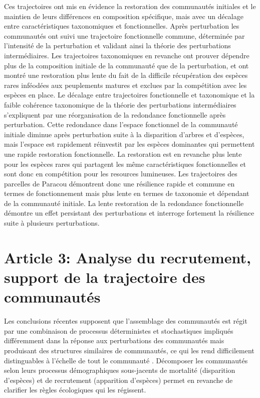 \documentclass[
  11pt,
  french,
  A4paper,
  extrafontsizes,onecolumn,openright
  ]{memoir}
\begin{document}
Ces trajectoires ont mis en évidence la restoration des communautés
initiales et le maintien de leurs différences en composition spécifique,
mais avec un décalage entre caractéristiques taxonomiques et
fonctionnelles. Après perturbation les communautés ont suivi une
trajectoire fonctionnelle commune, déterminée par l'intensité de la
perturbation et validant ainsi la théorie des perturbations
intermédiaires. Les trajectoires taxonomiques en revanche ont prouver
dépendre plus de la composition initiale de la communauté que de la
perturbation, et ont montré une restoration plus lente du fait de la
difficile récupération des espèces rares inféodées aux peuplements
matures et exclues par la compétition avec les espèces en place. Le
décalage entre trajectoires fonctionnelle et taxonomique et la faible
cohérence taxonomique de la théorie des perturbations intermédiaires
s'expliquent par une réorganisation de la redondance fonctionnelle après
perturbation. Cette redondance dans l'espace fonctionnel de la
communauté initiale diminue après perturbation suite à la disparition
d'arbres et d'espèces, mais l'espace est rapidement réinvestit par les
espèces dominantes qui permettent une rapide restoration fonctionnelle.
La restoration est en revanche plus lente pour les espèces rares qui
partagent les même caractéristiques fonctionnelles et sont donc en
compétition pour les resources lumineuses. Les trajectoires des
parcelles de Paracou démontrent donc une résilience rapide et commune en
termes de fonctionnement mais plus lente en termes de taxonomie et
dépendant de la communauté initiale. La lente restoration de la
redondance fonctionnelle démontre un effet persistant des perturbations
et interroge fortement la résilience suite à plusieurs perturbations.

\chapter{Article 3: Analyse du recrutement, support de la trajectoire
des
communautés}\label{article-3-analyse-du-recrutement-support-de-la-trajectoire-des-communautes}

Les conclusions récentes supposent que l'assemblage des communautés est
régit par une combinaison de processus déterministes et stochastiques
impliqués différemment dans la réponse aux perturbations des communautés
mais produisant des structures similaires de communautés, ce qui les
rend difficilement distinguables à l'échelle de tout le communauté
\autocites{Mouquet2003}{Chave2004}. Décomposer les communautés selon
leurs processus démographiques sous-jacents de mortalité (disparition
d'espèces) et de recrutement (apparition d'espèces) permet en revanche
de clarifier les règles écologiques qui les régissent.
\end{document}
